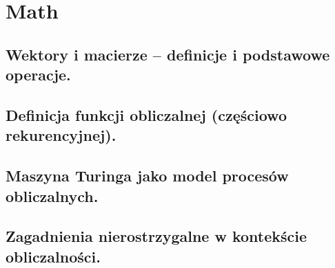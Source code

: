 \chapter{Math}
\section{Wektory i macierze – definicje i podstawowe operacje. }
\section{Definicja funkcji obliczalnej (częściowo rekurencyjnej).}
\section{Maszyna Turinga jako model procesów obliczalnych. }
\section{Zagadnienia nierostrzygalne w kontekście obliczalności.}
